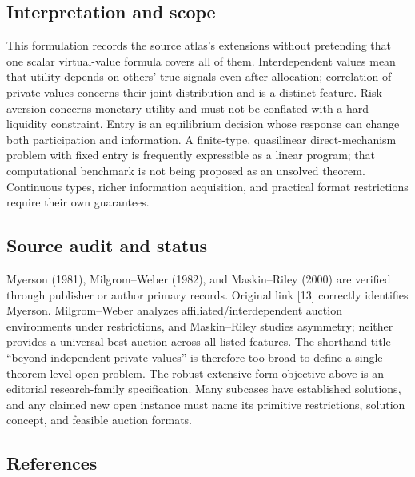 \documentclass[11pt,a4paper]{article}
\begin{document}
\subsection*{Interpretation and scope}

This formulation records the source atlas's extensions without pretending that one scalar virtual-value formula covers all of them. Interdependent values mean that utility depends on others' true signals even after allocation; correlation of private values concerns their joint distribution and is a distinct feature. Risk aversion concerns monetary utility and must not be conflated with a hard liquidity constraint. Entry is an equilibrium decision whose response can change both participation and information. A finite-type, quasilinear direct-mechanism problem with fixed entry is frequently expressible as a linear program; that computational benchmark is not being proposed as an unsolved theorem. Continuous types, richer information acquisition, and practical format restrictions require their own guarantees.

\subsection*{Source audit and status}

Myerson (1981), Milgrom--Weber (1982), and Maskin--Riley (2000) are verified through publisher or author primary records. Original link [13] correctly identifies Myerson. Milgrom--Weber analyzes affiliated/interdependent auction environments under restrictions, and Maskin--Riley studies asymmetry; neither provides a universal best auction across all listed features. The shorthand title ``beyond independent private values'' is therefore too broad to define a single theorem-level open problem. The robust extensive-form objective above is an editorial research-family specification. Many subcases have established solutions, and any claimed new open instance must name its primitive restrictions, solution concept, and feasible auction formats.

\subsection*{References}
\end{document}
